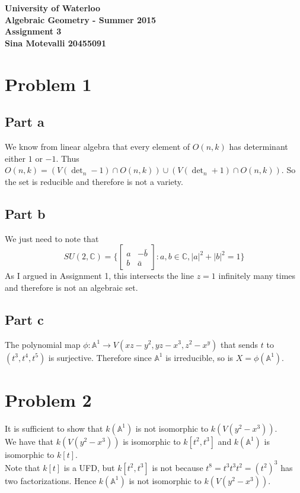 \documentclass[12pt]{article}
\begin{document}
\begin{center}
  {\Large\bf University of Waterloo}\\
  \vspace{3mm}
         {\Large\bf Algebraic Geometry - Summer 2015}\\
         \vspace{2mm}
                {\Large\bf Assignment 3}\\
                \vspace{3mm}
                \textbf{Sina Motevalli 20455091}
\end{center}
\section*{Problem 1}
\subsection*{Part a}
We know from linear algebra that every element of $O(n,k)$ has determinant either $1$ or $-1$. Thus
$O(n,k)=(V(\det_n -1) \cap O(n,k)) \cup (V(\det_n +1)\cap O(n,k))$. So the set is reducible and therefore is not a variety. 
\subsection*{Part b}
We just need to note that
$$SU(2,\mathbb{C})=\{
\begin{bmatrix}
a & -\bar{b} \\
b & \bar{a}
\end{bmatrix}
: a,b \in \mathbb{C}, |a|^2+|b|^2=1
\}
$$
As I argued in Assignment 1, this intersects the line $z=1$ infinitely many times and therefore is not an algebraic set.


\subsection*{Part c}
The polynomial map
$\phi: \mathbb{A}^1 \rightarrow V(xz-y^2,yz-x^3,z^2-x^y)$ that sends $t$ to $(t^3,t^4,t^5)$ is surjective. Therefore since $\mathbb{A}^1$ is irreducible, so is $X=\phi(\mathbb{A}^1)$.



\section*{Problem 2}
It is sufficient to show that $k(\mathbb{A}^1)$ is not isomorphic to $k(V(y^2-x^3))$.\\
We have that $k(V(y^2-x^3))$ is isomorphic to $k[t^2,t^3]$ and $k(\mathbb{A}^1)$ is isomorphic to $k[t]$. \\
Note that $k[t]$ is a UFD, but $k[t^2,t^3]$ is not because $t^8=t^3t^3t^2=(t^2)^3$ has two factorizations.
Hence $k(\mathbb{A}^1)$ is not isomorphic to $k(V(y^2-x^3))$.
\end{document}
